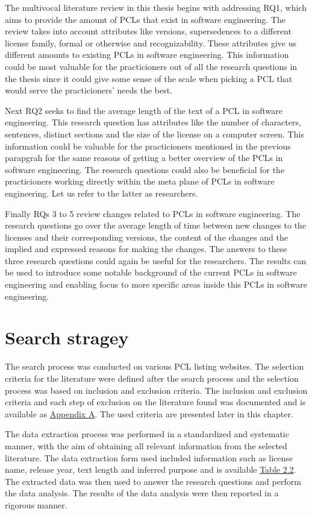 The multivocal literature review in this thesis begins with addressing RQ1, which aims to provide the amount of PCLs that exist in software engineering. The review takes into account attributes like versions, supersedences to a different license family, formal or otherwise and recognizability. These attributes give us different amounts to existing PCLs in software engineering. This information could be most valuable for the practicioners out of all the research questions in the thesis since it could give some sense of the scale when picking a PCL that would serve the practicioners' needs the best.

Next RQ2 seeks to find the average length of the text of a PCL in software engineering. This research question has attributes like the number of characters, sentences, distinct sections and the size of the license on a computer screen. This information could be valuable for the practicioners mentioned in the previous parapgrah for the same reasons of getting a better overview of the PCLs in software engineering. The research questions could also be beneficial for the practicioners working directly within the meta plane of PCLs in software engineering. Let us refer to the latter as researchers.

Finally RQs 3 to 5 review changes related to PCLs in software engineering. The research questions go over the average length of time between new changes to the licenses and their corresponding versions, the content of the changes and the implied and expressed reasons for making the changes. The answers to these three research questions could again be useful for the researchers. The results can be used to introduce some notable background of the current PCLs in software engineering and enabling focus to more specific areas inside this PCLs in software engineering.

\section{Search stragey}
The search process was conducted on various PCL listing websites. The selection criteria for the literature were defined after the search process and the selection process was based on inclusion and exclusion criteria. The inclusion and exclusion criteria and each step of exclusion on the literature found was documented and is available as \hyperref[appendix:a]{Appendix A}. The used criteria are presented later in this chapter.

The data extraction process was performed in a standardized and systematic manner, with the aim of obtaining all relevant information from the selected literature. The data extraction form used included information such as license name, release year, text length and inferred purpose and is available  \hyperref[table:extraction]{Table 2.2}. The extracted data was then used to answer the research questions and perform the data analysis. The results of the data analysis were then reported in a rigorous manner.
